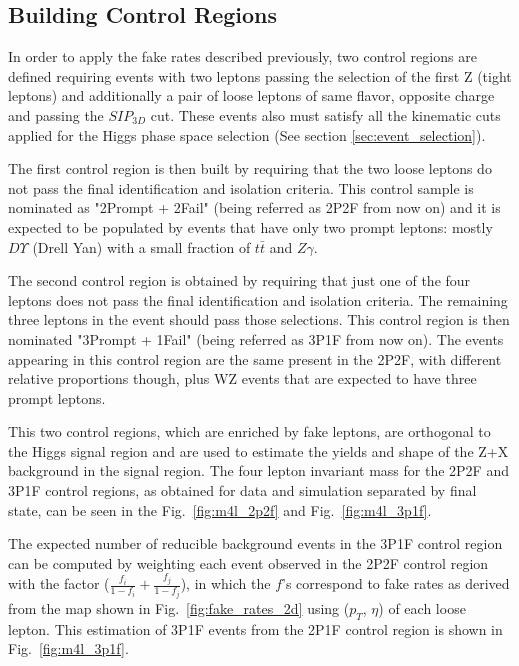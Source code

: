 \subsection{Building Control Regions}
\label{subsec:os_method}
In order to apply the fake rates described previously, two control regions are defined requiring events with two leptons passing the selection of the first Z (tight leptons) and additionally a pair of loose leptons of same flavor, opposite charge and passing the $SIP_{3D}$ cut. These events also must satisfy all the kinematic cuts applied for the Higgs phase space selection (See section \ref{sec:event_selection}). 

The first control region is then built by requiring that the two loose leptons do not pass the final identification and isolation criteria. This control sample is nominated as "2Prompt + 2Fail" (being referred as 2P2F from now on) and it is expected to be populated by events that have only two prompt leptons: mostly $D\Upsilon$ (Drell Yan) with a small fraction of $t\bar{t}$ and $Z\gamma$. 

The second control region is obtained by requiring that just one of the four leptons does not pass the final identification and isolation criteria. The remaining three leptons in the event should pass those selections. This control region is then nominated "3Prompt + 1Fail" (being referred as 3P1F from now on). The events appearing in this control region are the same present in the 2P2F, with different relative proportions though, plus WZ events that are expected to have three prompt leptons.

This two control regions, which are enriched by fake leptons, are orthogonal to the Higgs signal region and are used to estimate the yields and shape of the Z+X background in the signal region. The four lepton invariant mass for the 2P2F and 3P1F control regions, as obtained for data and simulation separated by final state, can be seen in the Fig.~\ref{fig:m4l_2p2f} and Fig.~\ref{fig:m4l_3p1f}.

The expected number of reducible background events in the 3P1F control region can be computed by weighting each event observed in the 2P2F control region with the factor ($\frac{f_{i}}{1-f_{i}}+\frac{f_{j}}{1-f_{j}}$), in which the $f$'s correspond to fake rates as derived from the map shown in Fig.~\ref{fig:fake_rates_2d} using ($p_{T}$, $\eta$) of each loose lepton. This estimation of 3P1F events from the 2P1F control region is shown in Fig.~\ref{fig:m4l_3p1f}. 

